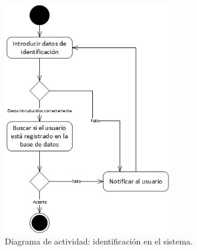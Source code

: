 \begin{figure}
	\centering
	\includegraphics[width=0.65\textwidth]{4.Disenio/Imagenes/ACT-Login}
	\caption{Diagrama de actividad: identificación en el sistema.}
	\label{fig:diagramaLogin}
\end{figure}